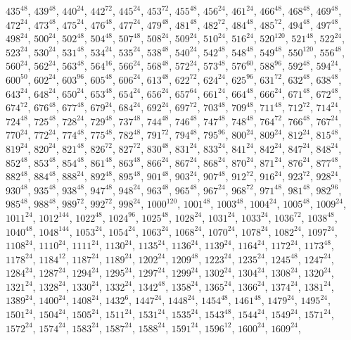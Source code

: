 \begin{itemize}
$435^{48}$, $439^{48}$, $440^{24}$, $442^{72}$, $445^{24}$, $453^{72}$, $455^{48}$, $456^{24}$, $461^{24}$, $466^{48}$, $468^{48}$, $469^{48}$, $472^{24}$, $473^{48}$, $475^{24}$, $476^{48}$, $477^{24}$, $479^{48}$, $481^{48}$, $482^{72}$, $484^{48}$, $485^{72}$, $494^{48}$, $497^{48}$, $498^{24}$, $500^{24}$, $502^{48}$, $504^{48}$, $507^{48}$, $508^{24}$, $509^{24}$, $510^{24}$, $516^{24}$, $520^{120}$, $521^{48}$, $522^{24}$, $523^{24}$, $530^{24}$, $531^{48}$, $534^{24}$, $535^{24}$, $538^{48}$, $540^{24}$, $542^{48}$, $548^{48}$, $549^{48}$, $550^{120}$, $556^{48}$, $560^{24}$, $562^{24}$, $563^{48}$, $564^{16}$, $566^{24}$, $568^{48}$, $572^{24}$, $573^{48}$, $576^{60}$, $588^{96}$, $592^{48}$, $594^{24}$, $600^{50}$, $602^{24}$, $603^{96}$, $605^{48}$, $606^{24}$, $613^{48}$, $622^{72}$, $624^{24}$, $625^{96}$, $631^{72}$, $632^{48}$, $638^{48}$, $643^{24}$, $648^{24}$, $650^{24}$, $653^{48}$, $654^{24}$, $656^{24}$, $657^{64}$, $661^{24}$, $664^{48}$, $666^{24}$, $671^{48}$, $672^{48}$, $674^{72}$, $676^{48}$, $677^{48}$, $679^{24}$, $684^{24}$, $692^{24}$, $697^{72}$, $703^{48}$, $709^{48}$, $711^{48}$, $712^{72}$, $714^{24}$, $724^{48}$, $725^{48}$, $728^{24}$, $729^{48}$, $737^{48}$, $744^{48}$, $746^{48}$, $747^{48}$, $748^{48}$, $764^{72}$, $766^{48}$, $767^{24}$, $770^{24}$, $772^{24}$, $774^{48}$, $775^{48}$, $782^{48}$, $791^{72}$, $794^{48}$, $795^{96}$, $800^{24}$, $809^{24}$, $812^{24}$, $815^{48}$, $819^{24}$, $820^{24}$, $821^{48}$, $826^{72}$, $827^{72}$, $830^{48}$, $831^{24}$, $833^{24}$, $841^{24}$, $842^{24}$, $847^{24}$, $848^{24}$, $852^{48}$, $853^{48}$, $854^{48}$, $861^{48}$, $863^{48}$, $866^{24}$, $867^{24}$, $868^{24}$, $870^{24}$, $871^{24}$, $876^{24}$, $877^{48}$, $882^{48}$, $884^{48}$, $888^{24}$, $892^{48}$, $895^{48}$, $901^{48}$, $903^{24}$, $907^{48}$, $912^{72}$, $916^{24}$, $923^{72}$, $928^{24}$, $930^{48}$, $935^{48}$, $938^{48}$, $947^{48}$, $948^{24}$, $963^{48}$, $965^{48}$, $967^{24}$, $968^{72}$, $971^{48}$, $981^{48}$, $982^{96}$, $985^{48}$, $988^{48}$, $989^{72}$, $992^{72}$, $998^{24}$, $1000^{120}$, $1001^{48}$, $1003^{48}$, $1004^{24}$, $1005^{48}$, $1009^{24}$, $1011^{24}$, $1012^{144}$, $1022^{48}$, $1024^{96}$, $1025^{48}$, $1028^{24}$, $1031^{24}$, $1033^{24}$, $1036^{72}$, $1038^{48}$, $1040^{48}$, $1048^{144}$, $1053^{24}$, $1054^{24}$, $1063^{24}$, $1068^{24}$, $1070^{24}$, $1078^{24}$, $1082^{24}$, $1097^{24}$, $1108^{24}$, $1110^{24}$, $1111^{24}$, $1130^{24}$, $1135^{24}$, $1136^{24}$, $1139^{24}$, $1164^{24}$, $1172^{24}$, $1173^{48}$, $1178^{24}$, $1184^{12}$, $1187^{24}$, $1189^{24}$, $1202^{24}$, $1209^{48}$, $1223^{24}$, $1235^{24}$, $1245^{48}$, $1247^{24}$, $1284^{24}$, $1287^{24}$, $1294^{24}$, $1295^{24}$, $1297^{24}$, $1299^{24}$, $1302^{24}$, $1304^{24}$, $1308^{24}$, $1320^{24}$, $1321^{24}$, $1328^{24}$, $1330^{24}$, $1332^{24}$, $1342^{48}$, $1358^{24}$, $1365^{24}$, $1366^{24}$, $1374^{24}$, $1381^{24}$, $1389^{24}$, $1400^{24}$, $1408^{24}$, $1432^{6}$, $1447^{24}$, $1448^{24}$, $1454^{48}$, $1461^{48}$, $1479^{24}$, $1495^{24}$, $1501^{24}$, $1504^{24}$, $1505^{24}$, $1511^{24}$, $1531^{24}$, $1535^{24}$, $1543^{48}$, $1544^{24}$, $1549^{24}$, $1571^{24}$, $1572^{24}$, $1574^{24}$, $1583^{24}$, $1587^{24}$, $1588^{24}$, $1591^{24}$, $1596^{12}$, $1600^{24}$, $1609^{24}$, 
\end{itemize}
